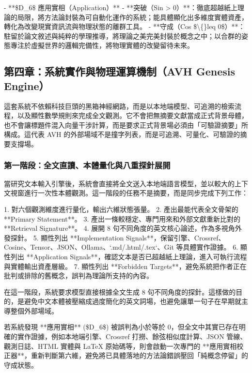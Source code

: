 \documentclass{article}
\begin{document}
- **\$D\_6\$ 應用實相（Application）**
  - **突破（Sin > 0）**：徹底超越紙上理論的局限，將方法論封裝為可自動化運作的系統；能具體顯化出多維度實體資產，轉化為改變現實資訊流與物理狀態的離群工具。
  - **守成（Cos \$\textbackslash\{\}leq 0\$）**：駐留於論文敘述與純粹的學理推導，將理論之美完美封裝於概念之中；以合群的姿態專注於虛擬世界的邏輯完備性，將物理實體的改變留待未來。

\subsection{第四章：系統實作與物理運算機制（AVH Genesis Engine）}

這套系統不依賴科技巨頭的黑箱神經網路，而是以本地端模型、可追溯的檢索流程，以及顯性數學規則來完成全文觀測。它不會把無摘要文獻當成正式背景母體，也不會讓標題件混入向量干涉計算，而是要求正式背景場必須由「可驗證摘要」所構成。這代表 AVH 的外部場域不是撞字列表，而是可追溯、可量化、可驗證的摘要支撐場。

\subsubsection{第一階段：全文直讀、本體量化與八重探針展開}

當研究文本輸入引擎後，系統會直接將全文送入本地端語言模型，並以較大的上下文視窗進行一次性本體觀測。這一階段的任務不是摘要，而是同步完成下列工作：

1. 對六個觀測維度進行量化，輸出六維狀態張量。  
2. 產出最能代表全文骨架的 **Primary Statement**。  
3. 產出一條較穩定、專門用來和外部文獻重新比對的 **Retrieval Signature**。  
4. 展開 8 句不同角度的英文核心論述，作為多視角外發探針。  
5. 顯性列出 **Implementation Signals**，保留引擎、Crossref、Cosine、Tensor、JSON、Ollama、`.md/.html/.tex`、Git 等具體實作證據。  
6. 顯性列出 **Application Signals**，確認文本是否已超越紙上理論，進入可執行流程與實體輸出資產層級。  
7. 顯性列出 **Forbidden Targets**，避免系統把作者正在批判或排除的舊概念，誤判為理論所支持的內容。  

在這一階段，系統要求模型直接根據全文生成 8 句不同角度的探針。這樣做的目的，是避免中文本體被壓縮成過度簡化的英文詞場，也避免讓單一句子在早期就主導整個外部場域。

若系統發現 **應用實相** (\$D\_6\$) 被誤判為小於等於 0，但全文中其實已存在明確的實作證據，例如本地端引擎、Crossref 打撈、餘弦相似度計算、JSON 管線、觀測日誌、HTML 實體與 LaTeX 原始碼等，則會啟動一次專門的 **應用實相校正器**，重新判斷第六維，避免將已具體落地的方法論錯誤壓回「純概念停留」的守成狀態。
\end{document}
